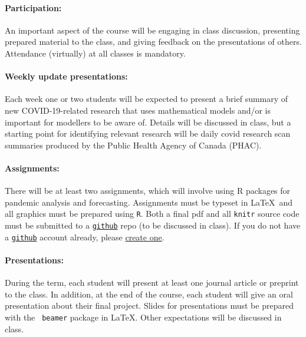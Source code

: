 \documentclass[12pt]{article}
\begin{document}

\paragraph*{Participation:} An important aspect of the course will be
engaging in class discussion, presenting prepared material to the
class, and giving feedback on the presentations of others.  Attendance
(virtually) at all classes is mandatory.

\paragraph*{Weekly update presentations:} Each week one or two
students will be expected to present a brief summary of new
COVID-19-related research that uses mathematical models and/or is
important for modellers to be aware of.  Details will be discussed in
class, but a starting point for identifying relevant research will be
daily covid research scan summaries produced by the Public Health
Agency of Canada (PHAC).

\paragraph*{Assignments:} 
There will be at least two assignments, which will involve using R
packages for pandemic analysis and forecasting.  Assignments must be
typeset in \LaTeX\ and all graphics must be prepared using {\tt R}.
Both a final pdf and all \texttt{knitr} source code must be submitted
to a \texttt{\href{http://github.com}{github}} repo (to be discussed
in class).  If you do not have a
\texttt{\href{http://github.com}{github}} account already, please
\href{https://github.com/join}{create one}.

\paragraph*{Presentations:}
During the term, each student will present at least one journal
article or preprint to the class.  In addition, at the end of the
course, each student will give an oral presentation about their final
project.  Slides for presentations must be prepared with the {\tt
  beamer} package in \LaTeX.  Other expectations will be discussed in
class.
\end{document}
